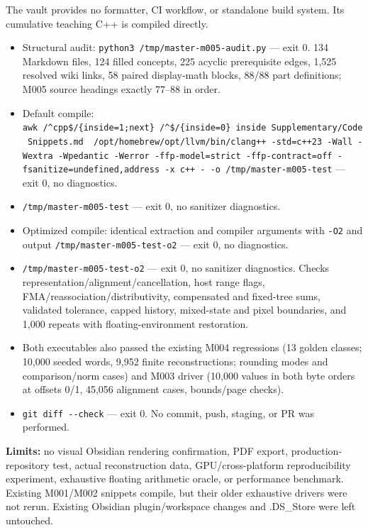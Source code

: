 The vault provides no formatter, CI workflow, or standalone build system. Its cumulative teaching C++ is compiled directly.

\begin{itemize}
\tightlist
\item
  Structural audit: \texttt{python3\ /tmp/master-m005-audit.py} --- exit 0. 134 Markdown files, 124 filled concepts, 225 acyclic prerequisite edges, 1,525 resolved wiki links, 58 paired display-math blocks, 88/88 part definitions; M005 source headings exactly 77--88 in order.
\item
  Default compile: \texttt{awk\ \textquotesingle{}/\^{}\textasciigrave{}\textasciigrave{}\textasciigrave{}cpp\$/\{inside=1;next\}\ /\^{}\textasciigrave{}\textasciigrave{}\textasciigrave{}\$/\{inside=0\}\ inside\textquotesingle{}\ \textquotesingle{}Supplementary/Code\ Snippets.md\textquotesingle{}\ \textbar{}\ /opt/homebrew/opt/llvm/bin/clang++\ -std=c++23\ -Wall\ -Wextra\ -Wpedantic\ -Werror\ -ffp-model=strict\ -ffp-contract=off\ -fsanitize=undefined,address\ -x\ c++\ -\ -o\ /tmp/master-m005-test} --- exit 0, no diagnostics.
\item
  \texttt{/tmp/master-m005-test} --- exit 0, no sanitizer diagnostics.
\item
  Optimized compile: identical extraction and compiler arguments with \texttt{-O2} and output \texttt{/tmp/master-m005-test-o2} --- exit 0, no diagnostics.
\item
  \texttt{/tmp/master-m005-test-o2} --- exit 0, no sanitizer diagnostics. Checks representation/alignment/cancellation, host range flags, FMA/reassociation/distributivity, compensated and fixed-tree sums, validated tolerance, capped history, mixed-state and pixel boundaries, and 1,000 repeats with floating-environment restoration.
\item
  Both executables also passed the existing M004 regressions (13 golden classes; 10,000 seeded words, 9,952 finite reconstructions; rounding modes and comparison/norm cases) and M003 driver (10,000 values in both byte orders at offsets 0/1, 45,056 alignment cases, bounds/page checks).
\item
  \texttt{git\ diff\ -\/-check} --- exit 0. No commit, push, staging, or PR was performed.
\end{itemize}

\textbf{Limits:} no visual Obsidian rendering confirmation, PDF export, production-repository test, actual reconstruction data, GPU/cross-platform reproducibility experiment, exhaustive floating arithmetic oracle, or performance benchmark. Existing M001/M002 snippets compile, but their older exhaustive drivers were not rerun. Existing Obsidian plugin/workspace changes and .DS\_Store were left untouched.

